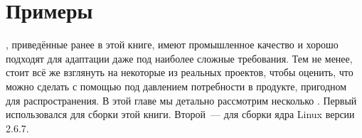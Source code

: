 \chapter{Примеры }
\label{chap:example_makefiles}

, приведённые ранее в этой книге, имеют промышленное
качество и хорошо подходят для адаптации даже под наиболее сложные
требования. Тем не менее, стоит всё же взглянуть на некоторые
 из реальных проектов, чтобы оценить, что можно сделать с
помощью \GNUmake{} под давлением потребности в продукте, пригодном для
распространения. В этой главе мы детально рассмотрим несколько
. Первый \Makefile{} использовался для сборки этой
книги. Второй~--- для сборки
ядра Linux версии 2.6.7.



